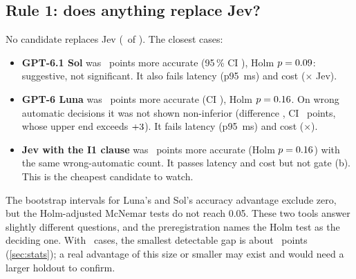 \subsection{Rule 1: does anything replace Jev?}\label{sec:rule1}

\begin{table}[htbp]
\centering\small
\caption{Rule 1 on the holdout \prereg: each candidate minus Jev, with paired-bootstrap 95\,\% CIs and
Holm-adjusted exact McNemar $p$ over the \RuleOneFamilyHold\ candidates. Bold Holm $p \le 0.05$. Gates as
in \cref{tab:rule1-dev}; all candidates also met gate (e), valid answers.}
\label{tab:rule1-hold}

\end{table}

No candidate replaces Jev (\NumReplacesHold\ of \RuleOneFamilyHold). The closest cases:
\begin{itemize}
  \item \textbf{GPT-6.1 Sol} was \SolHoldRAccDiff\ points more accurate (95\,\% CI \SolHoldRAccDiffCI),
    Holm $p = 0.09$: suggestive, not significant. It also fails latency (p95
    \SolHoldPninetyfive\,ms) and cost (\SolHoldCostX$\times$ Jev).
  \item \textbf{GPT-6 Luna} was \LunaHoldRAccDiff\ points more accurate (CI \LunaHoldRAccDiffCI), Holm
    $p = 0.16$. On wrong automatic decisions it was not shown non-inferior (difference
    \LunaHoldRWaDiff, CI \LunaHoldRWaDiffCI\ points, whose upper end exceeds $+3$). It fails
    latency (p95 \LunaHoldPninetyfive\,ms) and cost (\LunaHoldCostX$\times$).
  \item \textbf{Jev with the I1 clause} was \JevClHoldRAccDiff\ points more accurate (Holm $p =
    0.16$) with the same wrong-automatic count. It passes latency and cost but not gate
    (b). This is the cheapest candidate to watch.
\end{itemize}

\begin{caution}
The bootstrap intervals for Luna's and Sol's accuracy advantage exclude zero, but the Holm-adjusted
McNemar tests do not reach 0.05. These two tools answer slightly different questions, and the
preregistration names the Holm test as the deciding one. With \HoldN\ cases, the smallest detectable gap
is about \HoldMinDetectPts\ points (\cref{sec:stats}); a real advantage of this size or smaller may
exist and would need a larger holdout to confirm.
\end{caution}

